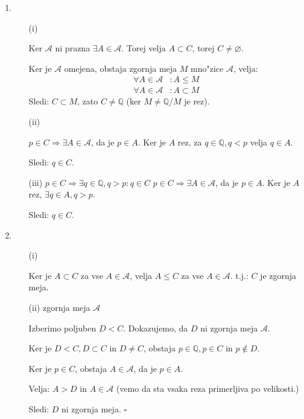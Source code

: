 \begin{enumerate}
	\item
	\begin{itemize}
		\item[(i)] 
		
		Ker $\mathcal{A}$ ni prazna $\exists A \in \mathcal{A}$. Torej velja $A \subset C$, torej $C \neq \varnothing$.
		
		
		Ker je $\mathcal{A}$ omejena, obstaja zgornja meja $M$ mno"zice $\mathcal{A}$, velja:
		\begin{align*}
			\forall A \in \mathcal{A}&: A \leq M\\
			\forall A \in \mathcal{A}&: A \subset M
		\end{align*}
		Sledi: $C \subset M$, zato $C \neq \mathbb{Q}$ (ker $M \neq \mathbb{Q}$/$M$ je rez).
		
		\item[(ii)] 
		
		$p \in C \Rightarrow \exists A \in \mathcal{A}$, da je $p \in A$. Ker je $A$ rez, za $q \in \mathbb{Q}, q < p$ velja $q \in A$.
		
		Sledi: $q \in C$.
		
		\item[(iii)] $p \in C \Rightarrow \exists q \in \mathbb{Q}, q > p: q \in C$
		$p \in C \Rightarrow \exists A \in \mathcal{A}$, da je $p \in A$. Ker je $A$ rez, $\exists q \in A, q > p$.
		
		Sledi: $q \in C$.
	\end{itemize}

	\item
	\begin{itemize}
		\item[(i)] 
		
		Ker je $A \subset C$ za vse $A \in \mathcal{A}$, velja $A \leq C$ za vse $A \in \mathcal{A}$. 
		t.j.: $C$ je zgornja meja.
		
		\item[(ii)]  zgornja meja $\mathcal{A}$
		
		Izberimo poljuben $D < C$. Dokazujemo, da $D$ ni zgornja meja $\mathcal{A}$.
		
		Ker je $D < C, D \subset C$ in $D \neq C$, obstaja $p \in \mathbb{Q}, p \in C$ in $p \notin D$.
		
		Ker je $p \in C$, obstaja $A \in \mathcal{A}$, da je $p \in A$.
		
		Velja: $A > D$ in $A \in \mathcal{A}$ (vemo da sta vsaka reza primerljiva po velikosti.)
		
		Sledi: $D$ ni zgornja meja.
		$\square$
	\end{itemize}
\end{enumerate}


